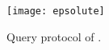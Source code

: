 \begin{figure}[h]
	\centering
	\texttt{[image: epsolute]}
	\caption{Query protocol \protocolQuery{} of \epsolute{}.}\label{figure:epsolute}
\end{figure}
